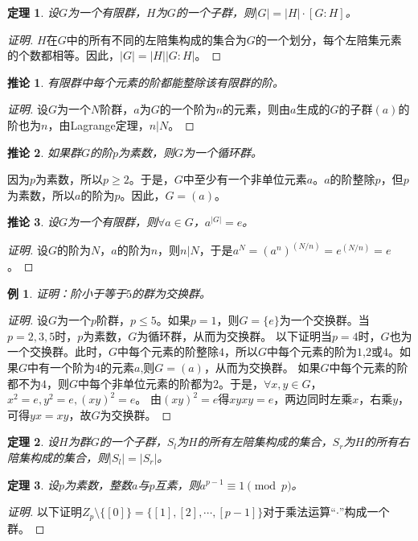 \documentclass{article}
\newtheorem{Thm}{定理}
\newtheorem*{Example}{例}
\newtheorem{Cor}{推论}
\begin{document}
\begin{CJK*}{UTF8}{gbsn}
\begin{Thm}
 设$G$为一个有限群，$H$为$G$的一个子群，则$|G|=|H|\cdot [G:H]$。 
\end{Thm}
\begin{proof}[证明]
  $H$在$G$中的所有不同的左陪集构成的集合为$G$的一个划分，每个左陪集元素的个数都相等。因此，$|G|=|H||G:H|$。
\end{proof}
\begin{Cor}
有限群中每个元素的阶都能整除该有限群的阶。
\end{Cor}
\begin{proof}[证明]
  设$G$为一个$N$阶群，$a$为$G$的一个阶为$n$的元素，则由$a$生成的$G$的子群$(a)$的阶也为$n$，由Lagrange定理，$n|N$。
\end{proof}
\begin{Cor}
  如果群$G$的阶$p$为素数，则$G$为一个循环群。
\end{Cor}
因为$p$为素数，所以$p\geq 2$。于是，$G$中至少有一个非单位元素$a$。$a$的阶整除$p$，但$p$为素数，所以$a$的阶为$p$。因此，$G=(a)$。
\begin{Cor}
  设$G$为一个有限群，则$\forall a\in G$，$a^{|G|}=e$。
\end{Cor}
\begin{proof}[证明]
  设$G$的阶为$N$，$a$的阶为$n$，则$n|N$，于是$a^N=(a^n)^{(N/n)}=e^{(N/n)}=e$。
\end{proof}
\begin{Example}
  证明：阶小于等于$5$的群为交换群。
\end{Example}
\begin{proof}[证明]
  设$G$为一个$p$阶群，$p\leq 5$。如果$p=1$，则$G=\{e\}$为一个交换群。当$p=2,3,5$时，$p$为素数，$G$为循环群，从而为交换群。
  以下证明当$p=4$时，$G$也为一个交换群。此时，$G$中每个元素的阶整除$4$，所以$G$中每个元素的阶为$1$,$2$或$4$。如果$G$中有一个阶为$4$的元素$a$,则$G=(a)$，从而为交换群。
  如果$G$中每个元素的阶都不为$4$，则$G$中每个非单位元素的阶都为$2$。于是，$\forall x,y\in G$，$x^2=e,y^2=e,(xy)^2=e$。
  由$(xy)^2=e$得$xyxy=e$，两边同时左乘$x$，右乘$y$，可得$yx=xy$，故$G$为交换群。

\end{proof}
\begin{Thm}
  设$H$为群$G$的一个子群，$S_l$为$H$的所有左陪集构成的集合，$S_r$为$H$的所有右陪集构成的集合，则$|S_l|=|S_r|$。
\end{Thm}

\begin{Thm}
  设$p$为素数，整数$a$与$p$互素，则$a^{p-1}\equiv 1 \pmod p$。
\end{Thm}
\begin{proof}[证明]
  以下证明$Z_p\setminus \{[0]\}=\{[1],[2],\cdots,[p-1]\}$对于乘法运算“$\cdot$”构成一个群。


\end{proof}
\end{CJK*}
\end{document}
